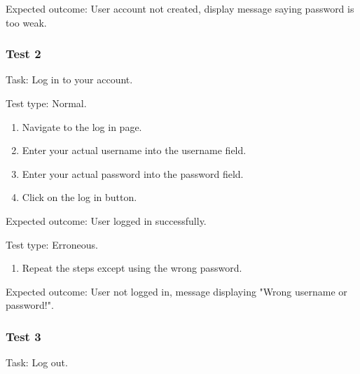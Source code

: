 {\sffamily Expected outcome:} User account not created, display 
message saying password is too weak.\\

{\color{gray} \hrulefill}

\vspace{0.2cm}

\subsubsection{Test 2}

{\sffamily Task:} Log in to your account.\\ 

{\color{gray} \hrulefill}

{\sffamily Test type: Normal.}\\

\begin{enumerate}
  \item Navigate to the log in page.
  \item Enter your actual username into the username field.
  \item Enter your actual password into the password field.
  \item Click on the log in button.
\end{enumerate}

{\sffamily Expected outcome:} User logged in successfully. \\ 

{\color{gray} \hrulefill}

{\sffamily Test type: Erroneous.}\\

\begin{enumerate}
  \item Repeat the steps except using the wrong password.
\end{enumerate}

{\sffamily Expected outcome:} User not logged in,
message displaying "Wrong username or password!". \\ 

{\color{gray} \hrulefill}

\vspace{0.2cm}

\subsubsection{Test 3}

{\sffamily Task:} Log out.\\ 

